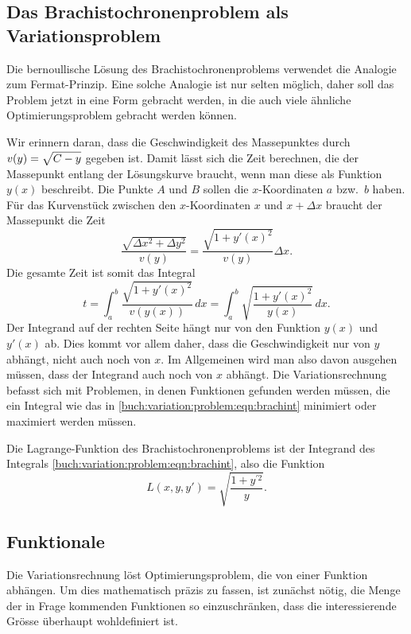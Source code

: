 %
%
\subsection{Das Brachistochronenproblem als Variationsproblem
\label{buch:variation:problem:subsection:variationsproblem}}
Die bernoullische Lösung des Brachistochronenproblems verwendet die
Analogie zum Fermat-Prinzip.
%
Eine solche Analogie ist nur selten möglich, daher soll das Problem
jetzt in eine Form gebracht werden, in die auch viele ähnliche
Optimierungsproblem gebracht werden können.

Wir erinnern daran, dass die Geschwindigkeit des Massepunktes durch
$v(y)=\sqrt{C-y\mathstrut}$ gegeben ist.
Damit lässt sich die Zeit berechnen, die der Massepunkt entlang der
Lösungskurve braucht, wenn man diese als Funktion $y(x)$ beschreibt.
Die Punkte $A$ und $B$ sollen die $x$-Koordinaten $a$ bzw.~$b$ haben.
Für das Kurvenstück zwischen den $x$-Koordinaten $x$ und $x+\Delta x$
braucht der Massepunkt die Zeit
\[
\frac{ \sqrt{\Delta x^2 + \Delta y^2} }{v(y)}
=
\frac{ \sqrt{1 + y'(x)^2} }{ v(y) } \Delta x.
\]
Die gesamte Zeit ist somit das Integral
\begin{equation}
t
=
\int_a^b \frac{\sqrt{1+y'(x)^2}}{v(y(x))}\,dx
=
\int_a^b \sqrt{\frac{1+y'(x)^2}{y(x)}}\,dx.
\label{buch:variation:problem:eqn:brachint}
\end{equation}
Der Integrand auf der rechten Seite hängt nur von den Funktion $y(x)$
und $y'(x)$ ab.
Dies kommt vor allem daher, dass die Geschwindigkeit nur von $y$ abhängt,
nicht auch noch von $x$.
Im Allgemeinen wird man also davon ausgehen müssen, dass der Integrand
auch noch von $x$ abhängt.
Die Variationsrechnung befasst sich mit Problemen, in denen Funktionen
gefunden werden müssen, die ein Integral wie das in
\eqref{buch:variation:problem:eqn:brachint}
minimiert oder maximiert werden müssen.

\begin{definition}
Die Lagrange-Funk\-tion des Brachistochronenproblems ist der
Integrand des Integrals
\eqref{buch:variation:problem:eqn:brachint},
%
also die Funktion
\[
L(x,y,y')
=
\sqrt{\frac{1+y^{\prime 2}}{y}}.
\]
\end{definition}

%
%
\subsection{Funktionale
\label{buch:variation:problem:subsection:funktionale}}
Die Variationsrechnung löst Optimierungsproblem, die von einer
Funktion abhängen.
%
Um dies mathematisch präzis zu fassen, ist zunächst nötig, die Menge
der in Frage kommenden Funktionen so einzuschränken, dass die interessierende
Grösse überhaupt wohldefiniert ist.

